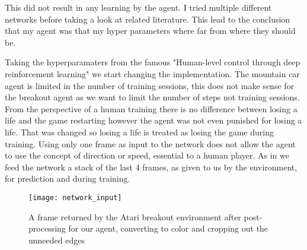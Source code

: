 This did not result in any learning by the agent. I tried multiple different networks before taking a look at related literature\cite{atari}. This lead to the conclusion that my agent was that my hyper parameters where far from where they should be.

Taking the hyperparamaters from the famous "Human-level control through deep reinforcement learning"\cite{DQN} we start changing the implementation. The mountain car agent is limited in the number of training sessions, this does not make sense for the breakout agent as we want to limit the number of steps not training sessions. From the perspective of a human training there is no difference between losing a life and the game restarting however the agent was not even punished for losing a life. That was changed so losing a life is treated as losing the game during training.
Using only one frame as input to the network does not allow the agent to use the concept of direction or speed, essential to a human player. As in\cite{DQN} we feed the network a stack of the last 4 frames, as given to us by the environment, for prediction and during training. 

\begin{figure}
    \texttt{[image: network\_input]}
    \caption{A frame returned by the Atari breakout environment after post-processing for our agent, converting to color and cropping out the unneeded edges}
    \label{fig:breakout_postprocess}
\end{figure}

